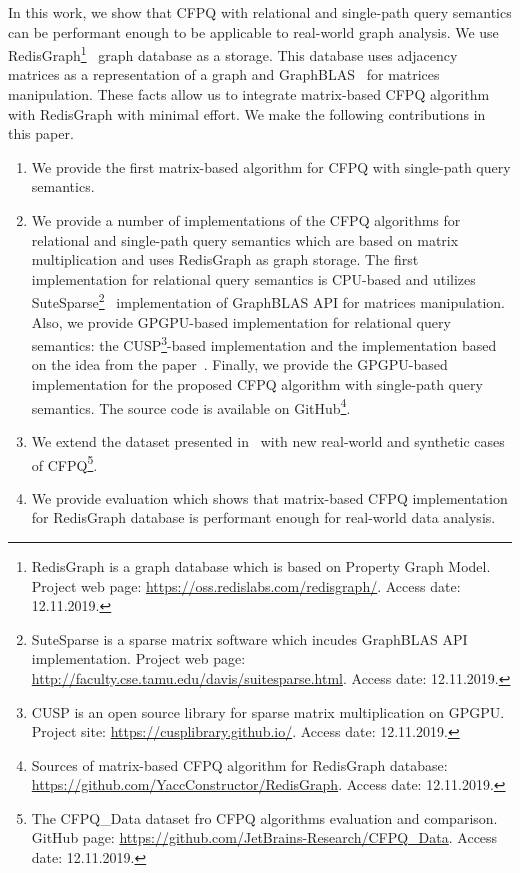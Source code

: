 In this work, we show that CFPQ with relational and single-path query semantics can be performant enough to be applicable to real-world graph analysis.
We use RedisGraph\footnote{RedisGraph is a graph database which is based on Property Graph Model. Project web page: \url{https://oss.redislabs.com/redisgraph/}. Access date: 12.11.2019.}~\cite{8778293} graph database as a storage.
This database uses adjacency matrices as a representation of a graph and GraphBLAS~\cite{7761646} for matrices manipulation.
These facts allow us to integrate matrix-based CFPQ algorithm with RedisGraph with minimal effort.
We make the following contributions in this paper.
\begin{enumerate}
\item We provide the first matrix-based algorithm for CFPQ with single-path query semantics.
\item We provide a number of implementations of the CFPQ algorithms for relational and single-path query semantics which are based on matrix multiplication and uses RedisGraph as graph storage.
The first implementation for relational query semantics is CPU-based and utilizes SuteSparse\footnote{SuteSparse is a sparse matrix software which incudes GraphBLAS API implementation. Project web page: \url{http://faculty.cse.tamu.edu/davis/suitesparse.html}. Access date: 12.11.2019.}~\cite{Davis2018Algorithm9S} implementation of GraphBLAS API for matrices manipulation.
Also, we provide GPGPU-based implementation for relational query semantics: the CUSP\footnote{CUSP is an open source library for sparse matrix multiplication on GPGPU. Project site: \url{https://cusplibrary.github.io/}. Access date: 12.11.2019.}-based implementation and the implementation based on the idea from the paper~\cite{NsparsePaper}. Finally, we provide the GPGPU-based implementation for the proposed CFPQ algorithm with single-path query semantics. 
The source code is available on GitHub\footnote{Sources of matrix-based CFPQ algorithm for RedisGraph database: \url{https://github.com/YaccConstructor/RedisGraph}. Access date: 12.11.2019.}.
\item We extend the dataset presented in~\cite{Mishin:2019:ECP:3327964.3328503} with new real-world and synthetic cases of CFPQ\footnote{The CFPQ\_Data dataset fro CFPQ algorithms evaluation and comparison. GitHub page: \url{https://github.com/JetBrains-Research/CFPQ_Data}. Access date: 12.11.2019.}.
\item We provide evaluation which shows that matrix-based CFPQ implementation for RedisGraph database is performant enough for real-world data analysis.
\end{enumerate}
